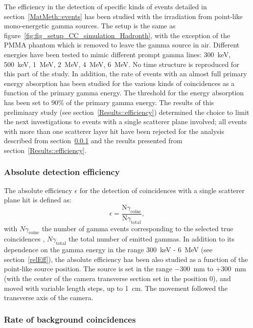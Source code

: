 The efficiency in the detection of specific kinds of events detailed in section~\ref{MatMeth::events} has been studied with the irradiation from point-like mono-energetic gamma sources. The setup is the same as figure~\ref{fig:fig_setup_CC_simulation_Hadronth}, with the exception of the PMMA phantom which is removed to leave the gamma source in air. Different energies have been tested to mimic different prompt gamma lines: 300~keV, 500~keV, 1~MeV, 2~MeV, 4~MeV, 6~MeV. No time structure is reproduced for this part of the study.
In addition, the rate of events with an almost full primary energy absorption has been studied for the various kinds of coincidences as a function of the primary gamma energy. The threshold for the energy absorption has been set to 90\% of the primary gamma energy. 
The results of this preliminary study (see section~\ref{Results::efficiency}) determined the choice to limit the next investigations to events with a single scatterer plane involved; all events with more than one scatterer layer hit have been rejected for the analysis described from section~\ref{absEff} and the results presented from section~\ref{Results::efficiency}.

\subsubsection{Absolute detection efficiency}\label{absEff}

The absolute efficiency $\epsilon$ for the detection of coincidences with a single scatterer plane hit is defined as:
\begin{equation}
\epsilon =\frac{\mathrm{N}\gamma_{\mathrm{coinc}}}{\mathrm{N}\gamma_{\mathrm{total}}},
\end{equation}
\label{eq:equation_efficacite_absolue}
with $N\gamma_{\mathrm{coinc}}$ the number of gamma events corresponding to the selected true coincidences , $N\gamma_{\mathrm{total}}$ the total number of emitted gammas.
In addition to its dependence on the gamma energy in the range 300~keV - 6~MeV (see section~\ref{relEff}), the absolute efficiency has been also studied as a function of the point-like source position. The source is set in the range $-300$~mm to $+300$~mm (with the center of the camera transverse section set in the position 0), and moved with variable length steps, up to 1~cm. The movement followed the transverse axis of the camera. 

\subsubsection{Rate of background coincidences}

